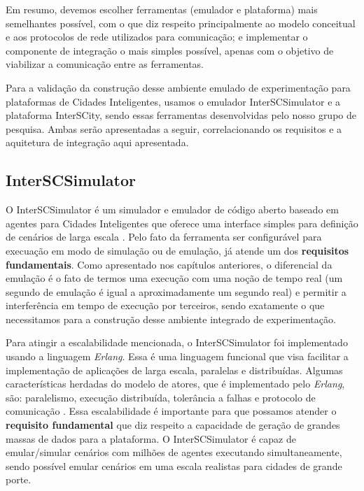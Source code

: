 Em resumo, devemos escolher ferramentas (emulador e plataforma) mais semelhantes possível, com o que diz respeito principalmente ao modelo conceitual e aos protocolos de
rede utilizados para comunicação; e implementar o componente de integração o mais simples possível, apenas com o objetivo de viabilizar a comunicação entre as ferramentas.

Para a validação da construção desse ambiente emulado de experimentação para plataformas de Cidades Inteligentes, usamos o emulador InterSCSimulator e a plataforma InterSCity,
sendo essas ferramentas desenvolvidas pelo nosso grupo de pesquisa. Ambas serão apresentadas a seguir, correlacionando os requisitos e a aquitetura de integração aqui
apresentada.

\subsection{InterSCSimulator}

O InterSCSimulator é um simulador e emulador de código aberto baseado em agentes para Cidades Inteligentes que oferece uma interface simples para definição de
cenários de larga escala \cite{santana_17}.
Pelo fato da ferramenta ser configurável para execuação em modo de simulação ou de emulação, já atende um dos \textbf{requisitos fundamentais}.
Como apresentado nos capítulos anteriores, o diferencial da emulação é o fato de termos uma execução com uma noção de tempo real (um segundo de emulação é igual a
aproximadamente um segundo real) e permitir a interferência em tempo de execução por terceiros, sendo exatamente o que necessitamos para a construção desse
ambiente integrado de experimentação.

Para atingir a escalabilidade mencionada, o InterSCSimulator foi implementado usando a linguagem \textit{Erlang}.
Essa é uma linguagem funcional que visa facilitar a implementação de aplicações de larga escala, paralelas e distribuídas.
Algumas características herdadas do modelo de atores, que é implementado pelo \textit{Erlang}, são: paralelismo, execução distribuída, tolerância a falhas e
protocolo de comunicação \cite{santana_17}.
Essa escalabilidade é importante para que possamos atender o \textbf{requisito fundamental} que diz respeito a capacidade de geração de grandes massas de dados
para a plataforma.
O InterSCSimulator é capaz de emular/simular cenários com milhões de agentes executando simultaneamente, sendo possível emular cenários em uma escala realistas para
cidades de grande porte.

